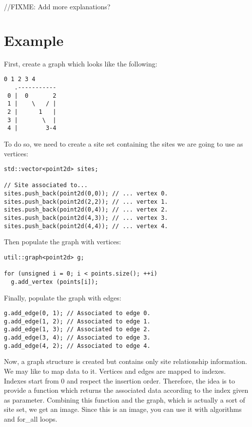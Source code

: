 \documentclass{report}
\begin{document}
//FIXME: Add more explanations?

\section{Example}

First, create a graph which looks like the following:

\begin{lstlisting}[frame=single]
      0 1 2 3 4
   .-----------
 0 |  0       2
 1 |    \   / |
 2 |      1   |
 3 |       \  |
 4 |        3-4
\end{lstlisting}

To do so, we need to create a site set containing the sites we are going to use
as vertices:

\begin{lstlisting}
std::vector<point2d> sites;

// Site associated to...
sites.push_back(point2d(0,0)); // ... vertex 0.
sites.push_back(point2d(2,2)); // ... vertex 1.
sites.push_back(point2d(0,4)); // ... vertex 2.
sites.push_back(point2d(4,3)); // ... vertex 3.
sites.push_back(point2d(4,4)); // ... vertex 4.
\end{lstlisting}

Then populate the graph with vertices:
\begin{lstlisting}
util::graph<point2d> g;

for (unsigned i = 0; i < points.size(); ++i)
  g.add_vertex (points[i]);
\end{lstlisting}

Finally, populate the graph with edges:
\begin{lstlisting}
g.add_edge(0, 1); // Associated to edge 0.
g.add_edge(1, 2); // Associated to edge 1.
g.add_edge(1, 3); // Associated to edge 2.
g.add_edge(3, 4); // Associated to edge 3.
g.add_edge(4, 2); // Associated to edge 4.
\end{lstlisting}

Now, a graph structure is created but contains only site relationship
information. We may like to map data to it. Vertices and edges are mapped to
indexes. Indexes start from 0 and respect the insertion order.
Therefore, the idea is to provide a function which returns the associated data
according to the index given as parameter. Combining this function and the
graph, which is actually a sort of site set, we get an image. Since this is an
image, you can use it with algorithms and for\_all loops.
\end{document}
